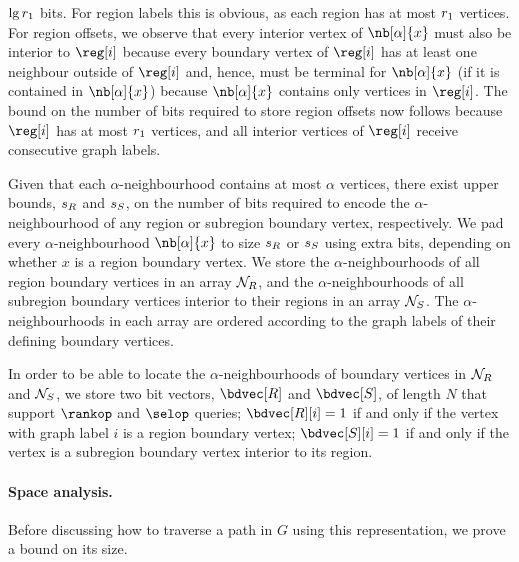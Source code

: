 {\begin{enumerate}
\begin{itemize}
    $\lg r_1$ bits.
    For region labels this is obvious, as each region has at most $r_1$
    vertices.
    For region offsets, we observe that every interior vertex of
    $\nb[\alpha]{x}$ must also be interior to $\reg[i]$ because every
    boundary vertex of $\reg[i]$ has at least one neighbour outside of
    $\reg[i]$ and, hence, must be terminal for $\nb[\alpha]{x}$ (if it is
    contained in $\nb[\alpha]{x}$) because $\nb[\alpha]{x}$ contains only
    vertices in $\reg[i]$.
    The bound on the number of bits required to store region offsets now
    follows because $\reg[i]$ has at most $r_1$ vertices, and all interior
    vertices of $\reg[i]$ receive consecutive graph labels.
  \end{itemize}
\end{enumerate}

Given that each $\alpha$-neighbourhood contains at most $\alpha$
vertices, there exist upper bounds, $s_R$ and $s_S$, on the number of
bits required to encode the $\alpha$-neighbourhood of any region or
subregion boundary vertex, respectively.
We pad every $\alpha$-neighbourhood $\nb[\alpha]{x}$ to size $s_R$ or
$s_S$ using extra bits, depending on whether $x$ is a region boundary
vertex.
We store the $\alpha$-neighbourhoods of all region boundary vertices in
an array $\mathcal{N}_R$, and the $\alpha$-neighbourhoods of all subregion boundary
vertices interior to their regions in an array $\mathcal{N}_S$.
The $\alpha$-neighbourhoods in each array are ordered according to the graph
labels of their defining boundary vertices.

In order to be able to locate the $\alpha$-neighbourhoods of boundary vertices
in $\mathcal{N}_R$ and $\mathcal{N}_S$, we store two bit vectors,
$\regbdvec$ and $\subregbdvec$, of length $N$ that support $\rankop$
and $\selop$ queries;
$\regbdvec[i] = 1$ if and only if the vertex with graph label $i$ is a region
boundary vertex; $\subregbdvec[i] = 1$ if and only if the vertex is a subregion
boundary vertex interior to its region.

\paragraph{Space analysis.}

Before discussing how to traverse a path in $G$ using this
representation, we prove a bound on its size.

}

